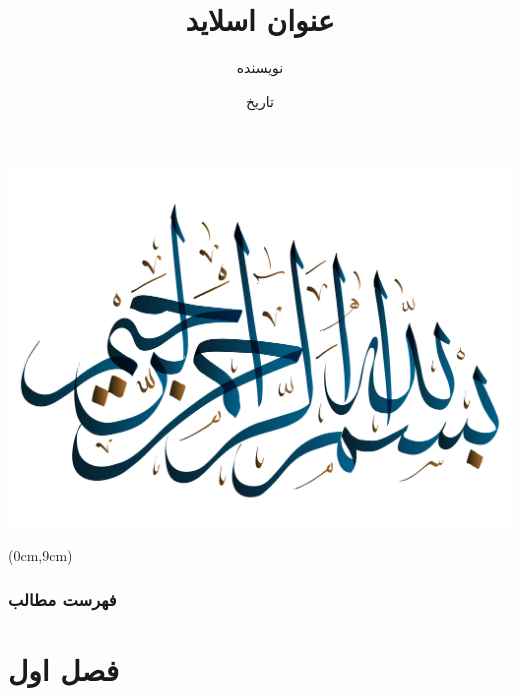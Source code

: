 

\title{عنوان اسلاید}
\author{نویسنده}
\date{تاریخ}




\begin{frame}
\includegraphics[width=7 cm]{assets/Besmellah.png}
\begin{textblock*}{13cm}(0cm,9cm)
\crule[white]{13cm}{1cm}
\end{textblock*}
\end{frame}



\begin{frame}
\maketitle
\end{frame}
\begin{frame}
\frametitle{فهرست مطالب}
\hfill
\parbox[t]{.95\textwidth}{
{
\setcounter{tocdepth}{1} 
\tableofcontents
}
}
\end{frame}



\section{فصل اول}


